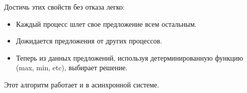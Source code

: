 \begin{remark}
Достичь этих свойств без отказа легко:
    \begin{itemize}
        \item Каждый процесс шлет свое предложение всем остальным.
        \item Дожидается предложения от других процессов.
        \item Теперь из данных предложений, используя детерминированную функцию 
            (max, min, etc), выбирает решение.
    \end{itemize}
\end{remark}

\begin{remark}
    Этот алгоритм работает и в асинхронной системе.
\end{remark}

